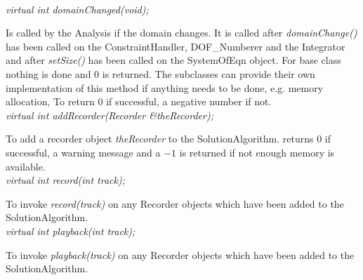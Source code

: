   \\
{\em virtual int domainChanged(void); } 

Is called by the Analysis if the domain changes. It is called after
{\em domainChange()} has been called on the ConstraintHandler,
DOF\_Numberer and the Integrator and after {\em setSize()} has been
called on the SystemOfEqn object. For base class nothing is done and
$0$ is returned. The subclasses can provide their own implementation
of this method if anything needs to be done, e.g. memory allocation,
To return $0$ if successful, a negative number if not. \\


{\em  virtual int  addRecorder(Recorder \&theRecorder);}

To add a recorder object {\em theRecorder} to the
SolutionAlgorithm. returns $0$ if successful, a warning message and a
$-1$ is returned if not enough memory is available. \\

{\em virtual int record(int track); } 

To invoke {\em record(track)} on any Recorder objects which have been added to the
SolutionAlgorithm. \\

{\em virtual int playback(int track); } 

To invoke {\em playback(track)} on any Recorder objects which have been added to the
SolutionAlgorithm. \\
